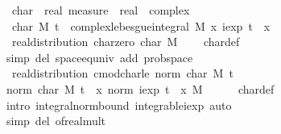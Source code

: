\documentclass[leqno]{article}
\theoremstyle{definition}
\begin{document}
\medskip

\begin{isabellebody}
\isamarkupfalse%
\isanewline
\ \ char\ {\isacharcolon}{\isacharcolon}\ {\isachardoublequoteopen}real\ measure\ {\isasymRightarrow}\ real\ {\isasymRightarrow}\ complex{\isachardoublequoteclose}\isanewline
{}\isanewline
\ \ {\isachardoublequoteopen}char\ M\ t\ {\isasymequiv}\ complex{\isacharunderscore}lebesgue{\isacharunderscore}integral\ M\ {\isacharparenleft}{\isasymlambda}x{\isachardot}\ iexp\ {\isacharparenleft}t\ {\isacharasterisk}\ x{\isacharparenright}{\isacharparenright}{\isachardoublequoteclose}\isanewline
\isanewline
{}\isamarkupfalse%
\ {\isacharparenleft}\ real{\isacharunderscore}distribution{\isacharparenright}\ char{\isacharunderscore}zero{\isacharcolon}\ {\isachardoublequoteopen}char\ M\ {}\ {\isacharequal}\ {}{\isachardoublequoteclose}\isanewline
{}\isamarkupfalse%
\ char{\isacharunderscore}def\ \isamarkupfalse%
\ {\isacharparenleft}simp\ del{\isacharcolon}\ space{\isacharunderscore}eq{\isacharunderscore}univ\ add{\isacharcolon}\ prob{\isacharunderscore}space{\isacharparenright}
\isamarkupfalse%
\ {\isacharparenleft}\ real{\isacharunderscore}distribution{\isacharparenright}\ cmod{\isacharunderscore}char{\isacharunderscore}le{\isacharunderscore}{}{\isacharcolon}\ {\isachardoublequoteopen}norm\ {\isacharparenleft}char\ M\ t{\isacharparenright}\ {\isasymle}\ {}{\isachardoublequoteclose}\isanewline
{}\isamarkupfalse%
\ {\isacharminus}\isanewline
\ \ \isamarkupfalse%
\ {\isachardoublequoteopen}norm\ {\isacharparenleft}char\ M\ t{\isacharparenright}\ {\isasymle}\ {\isacharparenleft}{\isasymintegral}x{\isachardot}\ norm\ {\isacharparenleft}iexp\ {\isacharparenleft}t\ {\isacharasterisk}\ x{\isacharparenright}{\isacharparenright}\ {\isasympartial}M{\isacharparenright}{\isachardoublequoteclose}\isanewline
\ \ \ \ \isamarkupfalse%
\ char{\isacharunderscore}def\ \isamarkupfalse%
\ {\isacharparenleft}intro\ integral{\isacharunderscore}norm{\isacharunderscore}bound\ integrable{\isacharunderscore}iexp{\isacharparenright}\ auto\isanewline
\ \ \isamarkupfalse%
\ \isamarkupfalse%
\ {\isachardoublequoteopen}{\isasymdots}\ {\isasymle}\ {}{\isachardoublequoteclose}\isanewline
\ \ \ \ \isamarkupfalse%
\ {\isacharparenleft}simp\ del{\isacharcolon}\ of{\isacharunderscore}real{\isacharunderscore}mult{\isacharparenright}\isanewline

\end{isabellebody}
\end{document}
